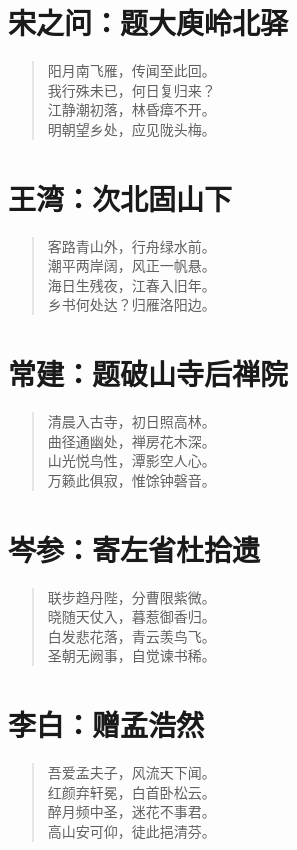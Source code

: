 \documentclass[12pt,oneside]{book}
\newenvironment{shici}{%
\begin{verse}\centering\yanti\large\hspace{12pt}}{\end{verse}}
\begin{document}
\begin{common-format}
\chapter{宋之问：题大庾岭北驿}
\begin{shici}
阳月南飞雁，传闻至此回。\\
我行殊未已，何日复归来？\\
江静潮初落，林昏瘴不开。\\
明朝望乡处，应见陇头梅。
\end{shici}

\chapter{王湾：次北固山下}
\begin{shici}
客路青山外，行舟绿水前。\\
潮平两岸阔，风正一帆悬。\\
海日生残夜，江春入旧年。\\
乡书何处达？归雁洛阳边。
\end{shici}

\chapter{常建：题破山寺后禅院}
\begin{shici}
清晨入古寺，初日照高林。\\
曲径通幽处，禅房花木深。\\
山光悦鸟性，潭影空人心。\\
万籁此俱寂，惟馀钟磬音。
\end{shici}

\chapter{岑参：寄左省杜拾遗}
\begin{shici}
联步趋丹陛，分曹限紫微。\\
晓随天仗入，暮惹御香归。\\
白发悲花落，青云羡鸟飞。\\
圣朝无阙事，自觉谏书稀。
\end{shici}

\chapter{李白：赠孟浩然}
\begin{shici}
吾爱孟夫子，风流天下闻。\\
红颜弃轩冕，白首卧松云。\\
醉月频中圣，迷花不事君。\\
高山安可仰，徒此挹清芬。
\end{shici}


\end{common-format}
\end{document}
